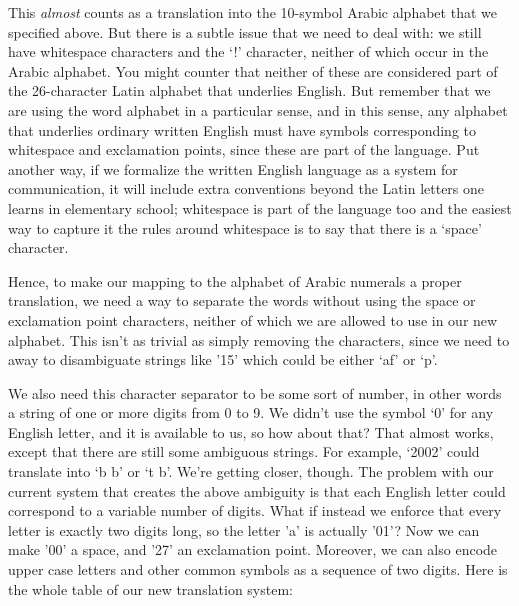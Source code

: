 \documentclass[UTF8]{book}
\begin{document}
\begin{CJK}{UTF8}{gbsn}
This \emph{almost} counts as a translation into the 10-symbol Arabic alphabet that we specified above. But there is a subtle issue that we need to deal with: we still have whitespace characters and the `!' character, neither of which occur in the Arabic alphabet. You might counter that neither of these are considered part of the 26-character Latin alphabet that underlies English. But remember that we are using the word alphabet in a particular sense, and in this sense, any alphabet that underlies ordinary written English must have symbols corresponding to whitespace and exclamation points, since these are part of the language. Put another way, if we formalize the written English language as a system for communication, it will include extra conventions beyond the Latin letters one learns in elementary school; whitespace is part of the language too and the easiest way to capture it the rules around whitespace is to say that there is a `space' character.

Hence, to make our mapping to the alphabet of Arabic numerals a proper translation, we need a way to separate the words without using the space or exclamation point characters, neither of which we are allowed to use in our new alphabet. This isn't as trivial as simply removing the characters, since we need to away to disambiguate strings like '15' which could be either `af' or `p'.

We also need this character separator to be some sort of number, in other words a string of one or more digits from 0 to 9. We didn't use the symbol `0' for any English letter, and it is available to us, so how about that? That almost works, except that there are still some ambiguous strings. For example, `2002' could translate into `b  b' or `t b'. We're getting closer, though. The problem with our current system that creates the above ambiguity is that each English letter could correspond to a variable number of digits. What if instead we enforce that every letter is exactly two digits long, so the letter 'a' is actually '01'? Now we can make '00' a space, and '27' an exclamation point. Moreover, we can also encode upper case letters and other common symbols as a sequence of two digits. Here is the whole table of our new translation system:


\end{CJK}
\end{document}
